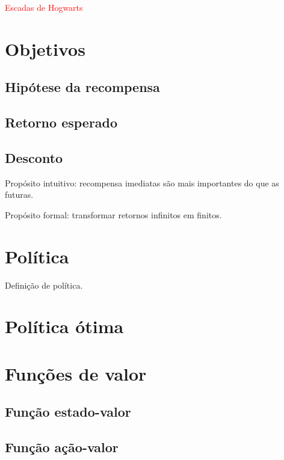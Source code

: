 \documentclass{article}
\begin{document}
        \textcolor{red}{Escadas de Hogwarts}
    
    \section{Objetivos}
    
        \subsection{Hipótese da recompensa}
    
        \subsection{Retorno esperado}
        
        \subsection{Desconto}
        
            Propósito intuitivo: recompensa imediatas são mais importantes do que as futuras.
            
            Propósito formal: transformar retornos infinitos em finitos.
        
    \section{Política}
    
        Definição de política.
    
        \section{Política ótima}
        
    
    \section{Funções de valor}
        
        \subsection{Função estado-valor}
        
        \subsection{Função ação-valor}
        
\end{document}
